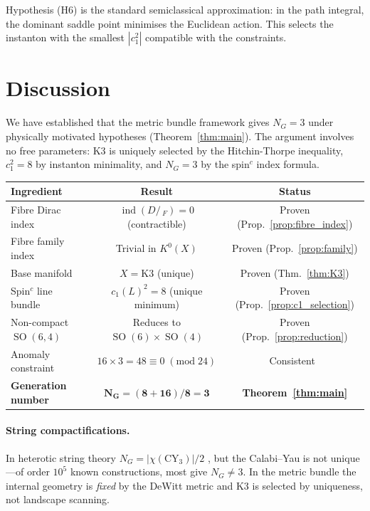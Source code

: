 \documentclass[12pt,a4paper]{article}
\theoremstyle{definition}
\newcommand{\SO}{\operatorname{SO}}
\newcommand{\ind}{\operatorname{ind}}
\begin{document}
Hypothesis (H6) is the standard semiclassical approximation: in the path integral, the dominant saddle point minimises the Euclidean action.
This selects the instanton with the smallest $|c_1^2|$ compatible with the constraints.


\section{Discussion}
\label{sec:discussion}

We have established that the metric bundle framework gives $N_G = 3$ under physically motivated hypotheses (Theorem~\ref{thm:main}).
The argument involves no free parameters: K3 is uniquely selected by the Hitchin-Thorpe inequality, $c_1^2 = 8$ by instanton minimality, and $N_G = 3$ by the spin$^c$ index formula.

\begin{center}
\renewcommand{\arraystretch}{1.3}
\begin{tabular}{lcc}
\toprule
\textbf{Ingredient} & \textbf{Result} & \textbf{Status} \\
\midrule
Fibre Dirac index & $\ind(D\!\!\!\!/\,_F) = 0$ (contractible) & Proven (Prop.~\ref{prop:fibre_index}) \\
Fibre family index & Trivial in $K^0(X)$ & Proven (Prop.~\ref{prop:family}) \\
Base manifold & $X = \mathrm{K3}$ (unique) & Proven (Thm.~\ref{thm:K3}) \\
Spin$^c$ line bundle & $c_1(L)^2 = 8$ (unique minimum) & Proven (Prop.~\ref{prop:c1_selection}) \\
Non-compact $\SO(6,4)$ & Reduces to $\SO(6) \times \SO(4)$ & Proven (Prop.~\ref{prop:reduction}) \\
Anomaly constraint & $16 \times 3 = 48 \equiv 0\; (\mathrm{mod}\; 24)$ & Consistent~\cite{Paper4} \\
\textbf{Generation number} & $\mathbf{N_G = (8 + 16)/8 = 3}$ & \textbf{Theorem~\ref{thm:main}} \\
\bottomrule
\end{tabular}
\end{center}

\paragraph{String compactifications.}
In heterotic string theory $N_G = |\chi(\mathrm{CY}_3)|/2$ \cite{CHSW1985}, but the Calabi--Yau is not unique---of order $10^5$ known constructions, most give $N_G \neq 3$.
In the metric bundle the internal geometry is \emph{fixed} by the DeWitt metric and K3 is selected by uniqueness, not landscape scanning.
\end{document}
